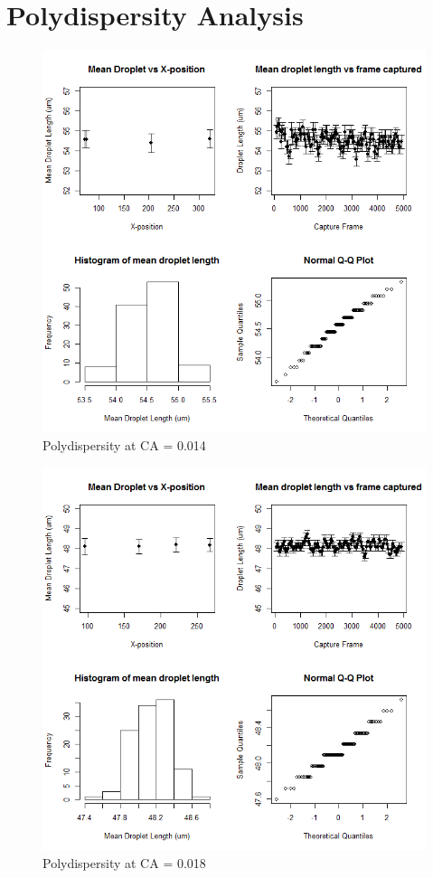 \chapter{Polydispersity Analysis}

\begin{figure}[H]
\centering 
\includegraphics[width=01.0\columnwidth]{2_poly.PNG} 
\caption[Polydispersity at CA = 0.014]{Polydispersity at CA = 0.014} 
\label{fig:2_poly} 
\end{figure}

\begin{figure}[H]
\centering 
\includegraphics[width=01.0\columnwidth]{3_poly.PNG} 
\caption[Polydispersity at CA = 0.018]{Polydispersity at CA = 0.018} 
\label{fig:3_poly} 
\end{figure}

